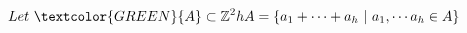 \documentclass[preview]{standalone}
\begin{document}
\begin{align*}
Let\ \textcolor{GREEN}{A} \subset\mathbb{Z}^2 hA=\{a_1+\cdots+a_h\ |\ a_1,\cdots a_h\in A\}
\end{align*}
\end{document}
